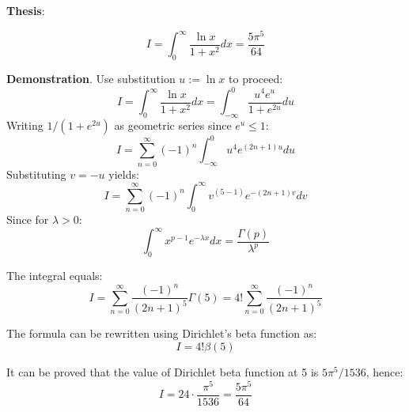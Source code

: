 \documentclass[12pt]{article}
\begin{document}
\textbf{Thesis}:

$$ I = \int_{0}^{\infty} \frac{\ln x}{1+x^2} dx = \frac{5\pi^5}{64} $$

\textbf{Demonstration}. Use substitution $ u := \ln x$ to proceed:
\begin{equation*}
I = \int_{0}^{\infty} \frac{\ln x}{1+x^2} dx = \int_{-\infty}^{0} \frac{u^4 e^u}{1 + e^{2u}} du
\end{equation*}
Writing $1/(1+e^{2u})$ as geometric series since $e^u \leq 1$:
\begin{equation*}
I = \sum_{n=0}^{\infty} (-1)^n \int_{-\infty}^{0} u^4 e^{(2n+1)u} du
\end{equation*}
Substituting $v = -u$ yields:
\begin{equation*}
I = \sum_{n=0}^{\infty} (-1)^n \int_{0}^{\infty} v^{(5-1)} e^{-(2n+1)v} dv
\end{equation*}
Since for $\lambda > 0$:
\begin{equation*}
\int_{0}^{\infty} x^{p-1} e^{-\lambda x} dx = \frac{\Gamma(p)}{\lambda^p}
\end{equation*}

The integral equals:
\begin{equation*}
I = \sum_{n=0}^{\infty} \frac{(-1)^n}{(2n+1)^5} \Gamma(5) = 4! \sum_{n=0}^{\infty} \frac{(-1)^n}{(2n+1)^5}
\end{equation*}

The formula can be rewritten using Dirichlet's beta function as:
\begin{equation*}
I = 4! \beta(5)
\end{equation*}

It can be proved that the value of Dirichlet beta function at 5 is $5\pi^5 / 1536$, hence:
\begin{equation*}
I = 24 \cdot \frac{\pi^5}{1536} = \frac{5\pi^5}{64}
\end{equation*}
\end{document}
